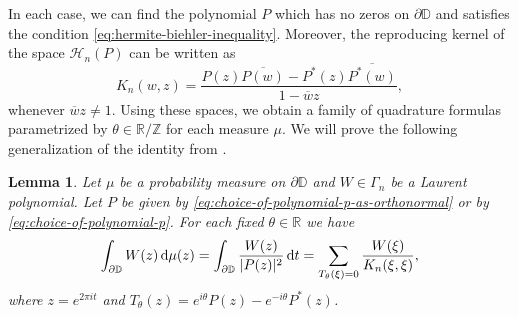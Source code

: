 \documentclass[reqno, a4paper]{amsart}
\def\R{\mathbb{R}}
\def\T{\mathbb{R}/\mathbb{Z}}
\renewcommand{\d}{\text{\rm d}}
\newcommand{\dD}{\partial\mathbb{D}}
\theoremstyle{plain}
\newtheorem{lemma}[theorem]{Lemma}
\theoremstyle{definition}
\theoremstyle{remarkstyle}
\numberwithin{equation}{section}
\begin{document}
In each case, we can find the polynomial $P$ which has no zeros on $\dD$ and satisfies the condition \eqref{eq:hermite-biehler-inequality}. Moreover, the reproducing kernel of the space $\mathcal{H}_n(P)$ can be written as 
\begin{equation}\label{eq:reproducing-kernel-formula}
    K_n(w, z)=\frac{P(z) \overline{P(w)}-P^*(z) \overline{P^*(w)}}{1-\overline{w}z},
\end{equation}
whenever $\overline{w}z\neq 1$. Using these spaces, we obtain a family of quadrature formulas parametrized by $\theta\in\T$ for each measure $\mu$.
We will prove the following generalization of the identity from \cite[Corollary 26]{CarneiroExtremalFunctionsBrangesEuclidean2014}.
\begin{lemma}\label{lem:quadrature-formula-for-laurent-polynomials}
Let $\mu$ be a probability measure on $\dD$ and $W\in \Gamma_n$ be a Laurent polynomial. Let $P$ be given by \eqref{eq:choice-of-polynomial-p-as-orthonormal} or by \eqref{eq:choice-of-polynomial-p}. For each fixed $\theta\in \R$ we have 
\begin{equation}\label{eq:quadrature formula for W}
    \int_{\dD} W(z)\, \d\mu(z)=\int_{\dD}\frac{W(z)}{|P(z)|^2}\,\d t=\sum_{T_\theta(\xi)=0}\frac{W(\xi)}{K_{n}(\xi, \xi)},
\end{equation}
where $z=e^{2\pi i t}$ and $T_\theta(z)=e^{i\theta}P(z)-e^{-i\theta}P^*(z)$.
\end{lemma}
\end{document}
